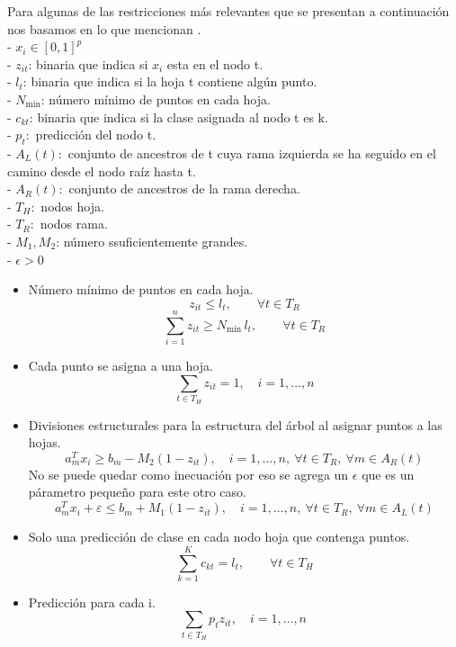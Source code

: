 Para algunas de las restricciones más relevantes que se presentan a continuación nos basamos en lo que mencionan \cite{Bertsimas2017}.\\
- $x_{i} \in [0, 1]^{p}$\\
- $z_{it}$: binaria que indica si $x_{i}$ esta en el nodo t.\\
- $l_t$: binaria que indica si la hoja t contiene algún punto. \\
- $N_{\min}$: número mínimo de puntos en cada hoja.\\
- $c_{kt}$: binaria que indica si la clase asignada al nodo t es k.\\
- $p_{t}:$ predicción del nodo t.\\
- $A_{L}(t):$ conjunto de ancestros de t cuya rama izquierda se ha seguido en el camino desde el nodo raíz hasta t.\\
- $A_{R}(t):$ conjunto de ancestros de la rama derecha.\\
- $T_{H}:$ nodos hoja.\\
- $T_{R}:$ nodos rama.\\
- $M_{1}, M_{2}$: número ssuficientemente grandes.\\
- $\epsilon > 0$
\begin{itemize}
    \item Número mínimo de puntos en cada hoja.\[
z_{it} \le l_t, \qquad \forall t \in T_R
\]
    \[
\sum_{i=1}^{n} z_{it} \ge N_{\min} \, l_t, \qquad \forall t \in T_R
\]
    \item Cada punto se asigna a una hoja.
    \[
\sum_{t \in T_H} z_{it} = 1, \quad i = 1, \dots, n
\]
    \item Divisiones estructurales para la estructura del árbol al asignar puntos a las hojas.\[
a_{m}^{T} x_i \ge b_{m} - M_{2}(1 - z_{it}), \quad i = 1,\ldots,n,\ \forall t \in T_R,\ \forall m \in A_R(t)
\]
    No se puede quedar como inecuación por eso se agrega un $\epsilon$ que es un párametro pequeño para este otro caso.
    \[
a_{m}^{T} x_i + \varepsilon \le b_{m} + M_{1}(1 - z_{it}), 
\quad i = 1,\ldots,n,\ \forall t \in T_R,\ \forall m \in A_L(t)
\]
    \item Solo una predicción de clase en cada nodo hoja que contenga puntos. \[
\sum_{k=1}^{K} c_{kt} = l_t, \qquad \forall t \in T_H
\]
    \item Predicción para cada i.
    \[
    \sum_{t \in T_{H}}p_{t} z_{it}, \quad  i = 1, \ldots,n\
    \]
\end{itemize}
